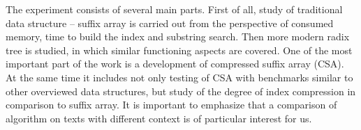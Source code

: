 
The experiment consists of several main parts.
First of all, study of traditional data structure -- suffix array is carried out
from the perspective of consumed memory, time to build the index and substring search.
Then more modern radix tree is studied, in which similar functioning aspects are covered.
One of the most important part of the work is a development of compressed suffix array (CSA).
At the same time it includes not only testing of CSA with benchmarks similar to other overviewed
data structures, but study of the degree of index compression in comparison to suffix array.
It is important to emphasize that a comparison of algorithm on texts with different context
is of particular interest for us.
